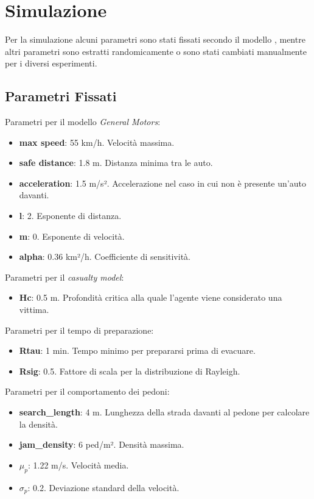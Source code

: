 \section{Simulazione}
\label{sec:simulazione}
Per la simulazione alcuni parametri sono stati fissati secondo il modello \parencite{mostafizi2017agent},
 mentre altri parametri sono estratti randomicamente 
o sono stati cambiati manualmente per i diversi esperimenti.

\subsection{Parametri Fissati}
\label{ssec:parametri-fissi}

Parametri per il modello \textit{General Motors}:
\begin{itemize}
    \item \textbf{max speed}: 55 km/h. Velocità massima.
    \item \textbf{safe distance}: 1.8 m. Distanza minima tra le auto.
    \item \textbf{acceleration}: 1.5 m/s². Accelerazione nel caso in cui non è presente un'auto davanti.
    \item \textbf{l}: 2. Esponente di distanza.
    \item \textbf{m}: 0. Esponente di velocità.
    \item \textbf{alpha}: 0.36 km²/h. Coefficiente di sensitività. 
\end{itemize}

\noindent
Parametri per il \textit{casualty model}:
\begin{itemize}
  \item \textbf{Hc}: 0.5 m. Profondità critica alla quale l'agente viene considerato una vittima.
\end{itemize}

\noindent
Parametri per il tempo di preparazione:
\begin{itemize}
  \item \textbf{Rtau}: 1 min. Tempo minimo per prepararsi prima di evacuare.
  \item \textbf{Rsig}: 0.5. Fattore di scala per la distribuzione di Rayleigh.
\end{itemize}

\noindent
Parametri per il comportamento dei pedoni:
\begin{itemize}
  \item \textbf{search\_length}: 4 m. Lunghezza della strada davanti al pedone per calcolare la densità.
  \item \textbf{jam\_density}: 6 ped/m². Densità massima.
  \item \textbf{$\mu_p$}: 1.22 m/s. Velocità media.
  \item \textbf{$\sigma_p$}: 0.2. Deviazione standard della velocità.
\end{itemize}

